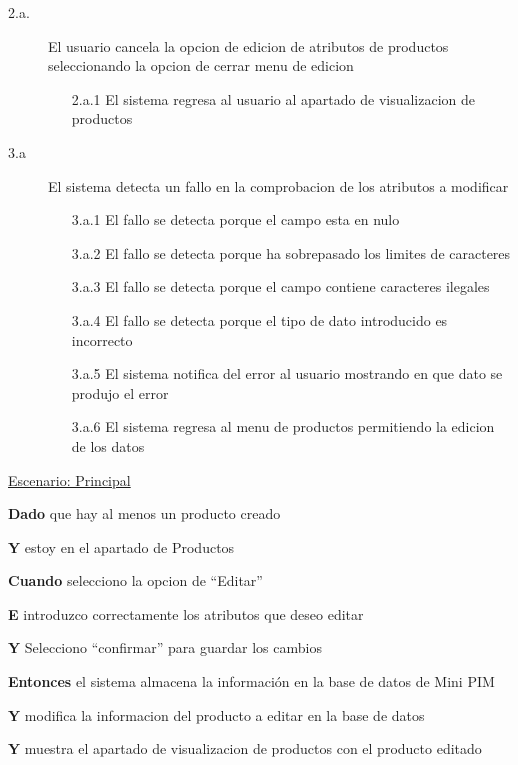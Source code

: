 \begin{description}
    \item[2.a.] El usuario cancela la opcion de edicion de atributos de productos seleccionando la opcion de cerrar menu de edicion
    \begin{enumerate}
        \item[2.a.1] El sistema regresa al usuario al apartado de visualizacion de productos
    \end{enumerate}

    \item[3.a] El sistema detecta un fallo en la comprobacion de los atributos a modificar
    \begin{enumerate}
        \item[3.a.1] El fallo se detecta porque el campo esta en nulo
        \item[3.a.2] El fallo se detecta porque ha sobrepasado los limites de caracteres
        \item[3.a.3] El fallo se detecta porque el campo contiene caracteres ilegales
        \item[3.a.4] El fallo se detecta porque el tipo de dato introducido es incorrecto
        \item[3.a.5] El sistema notifica del error al usuario mostrando en que dato se produjo el error
        \item[3.a.6] El sistema regresa al menu de productos permitiendo la edicion de los datos
    \end{enumerate}
\end{description}

\underline{Escenario: Principal}\par
\vspace{0.15cm}
\textbf{Dado} que hay al menos un producto creado\par
\textbf{Y} estoy en el apartado de Productos\par
\textbf{Cuando} selecciono la opcion de “Editar”\par
\textbf{E} introduzco correctamente los atributos que deseo editar\par
\textbf{Y} Selecciono “confirmar” para guardar los cambios\par
\textbf{Entonces} el sistema almacena la información en la base de datos de Mini PIM\par
\textbf{Y} modifica la informacion del producto a editar en la base de datos\par
\textbf{Y} muestra el apartado de visualizacion de productos con el producto editado\par
\vspace{0.20cm}

